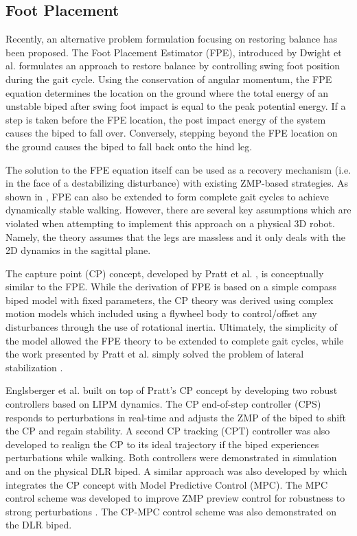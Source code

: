 \subsection{Foot Placement} %
\label{sub:related_foot_placement}
Recently, an alternative problem formulation focusing on restoring balance has been proposed. The Foot Placement Estimator (FPE), introduced by Dwight et al. \cite{Wight:2008ii} formulates an approach to restore balance by controlling swing foot position during the gait cycle. Using the conservation of angular momentum, the FPE equation determines the location on the ground where the total energy of an unstable biped after swing foot impact is equal to the peak potential energy. If a step is taken before the FPE location, the post impact energy of the system causes the biped to fall over. Conversely, stepping beyond the FPE location on the ground causes the biped to fall back onto the hind leg.

The solution to the FPE equation itself can be used as a recovery mechanism (i.e. in the face of a destabilizing disturbance) with existing ZMP-based strategies. As shown in \cite{Wight:2008ii,Wight:2008vt}, FPE can also be extended to form complete gait cycles to achieve dynamically stable walking. However, there are several key assumptions which are violated when attempting to implement this approach on a physical 3D robot. Namely, the theory assumes that the legs are massless and it only deals with the 2D dynamics in the sagittal plane.

The capture point (CP) concept, developed by Pratt et al. \cite{Pratt:2006vy}, is conceptually similar to the FPE. While the derivation of FPE is based on a simple compass biped model with fixed parameters, the CP theory was derived using complex motion models which included using a flywheel body to control/offset any disturbances through the use of rotational inertia. Ultimately, the simplicity of the model allowed the FPE theory to be extended to complete gait cycles, while the work presented by Pratt et al. simply solved the problem of lateral stabilization \cite{Wight:2008ii}.

Englsberger et al. built on top of Pratt's CP concept \cite{Englsberger:2011jx} by developing two robust controllers based on LIPM dynamics. The CP end-of-step controller (CPS) responds to perturbations in real-time and adjusts the ZMP of the biped to shift the CP and regain stability. A second CP tracking (CPT) controller was also developed to realign the CP to its ideal trajectory if the biped experiences perturbations while walking. Both controllers were demonstrated in simulation and on the physical DLR biped. A similar approach was also developed by \cite{Krause:2012vo} which integrates the CP concept with Model Predictive Control (MPC). The MPC control scheme was developed to improve ZMP preview control for robustness to strong perturbations \cite{Wieber2006}. The CP-MPC control scheme was also demonstrated on the DLR biped.


